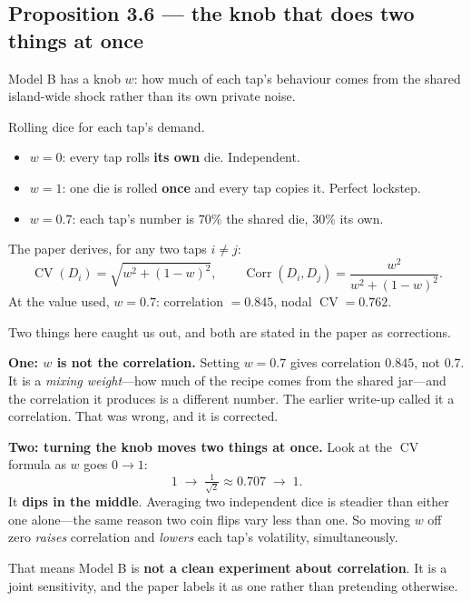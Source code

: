 \documentclass[11pt,a4paper]{article}
\newcommand{\CV}{\operatorname{CV}}
\begin{document}
\subsection{Proposition 3.6 --- the knob that does two things at once}

Model B has a knob $w$: how much of each tap's behaviour comes from the shared
island-wide shock rather than its own private noise.

\begin{anchor}
Rolling dice for each tap's demand.

\begin{itemize}
\item $w = 0$: every tap rolls \textbf{its own} die. Independent.
\item $w = 1$: one die is rolled \textbf{once} and every tap copies it. Perfect
      lockstep.
\item $w = 0.7$: each tap's number is $70\%$ the shared die, $30\%$ its own.
\end{itemize}
\end{anchor}

\begin{build}
The paper derives, for any two taps $i \ne j$:
\[
\CV(D_i) = \sqrt{w^2 + (1-w)^2},
\qquad
\operatorname{Corr}(D_i, D_j) = \frac{w^2}{w^2 + (1-w)^2}.
\]
At the value used, $w = 0.7$: correlation $= 0.845$, nodal $\CV = 0.762$.
\end{build}

\begin{watch}
Two things here caught us out, and both are stated in the paper as corrections.

\smallskip
\textbf{One: $w$ is not the correlation.} Setting $w = 0.7$ gives correlation
$0.845$, not $0.7$. It is a \emph{mixing weight}---how much of the recipe comes
from the shared jar---and the correlation it produces is a different number.
The earlier write-up called it a correlation. That was wrong, and it is
corrected.

\smallskip
\textbf{Two: turning the knob moves two things at once.} Look at the $\CV$
formula as $w$ goes $0 \to 1$:
\[
1 \;\longrightarrow\; \tfrac{1}{\sqrt2} \approx 0.707 \;\longrightarrow\; 1 .
\]
It \textbf{dips in the middle}. Averaging two independent dice is steadier than
either one alone---the same reason two coin flips vary less than one. So moving
$w$ off zero \emph{raises} correlation and \emph{lowers} each tap's volatility,
simultaneously.

That means Model B is \textbf{not a clean experiment about correlation}. It is a
joint sensitivity, and the paper labels it as one rather than pretending
otherwise.
\end{watch}
\end{document}
